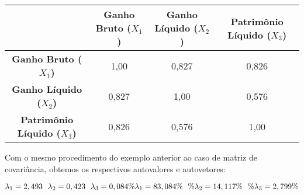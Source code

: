 \documentclass[
]{book}
\begin{document}
\begin{longtable}[]{@{}cccc@{}}
\toprule
& \textbf{Ganho Bruto (\(X_1\))} & \textbf{Ganho Líquido (\(X_2\))} & \textbf{Patrimônio Líquido (\(X_3\))}\tabularnewline
\midrule
\endhead
\textbf{Ganho Bruto (\(X_1\))} & 1,00 & 0,827 & 0,826\tabularnewline
\textbf{Ganho Líquido (\(X_2\))} & 0,827 & 1,00 & 0,576\tabularnewline
\textbf{Patrimônio Líquido (\(X_3\))} & 0,826 & 0,576 & 1,00\tabularnewline
\bottomrule
\end{longtable}

Com o mesmo procedimento do exemplo anterior ao caso de matriz de covariância, obtemos os respectivos autovalores e autovetores:

\[\lambda_1=2,493 \ \ \lambda_2=0,423 \ \ \lambda_3=0,084 \\
\%\lambda_1=83,084\% \ \ \%\lambda_2=14,117\% \ \ \%\lambda_3=2,799\%\]
\end{document}
